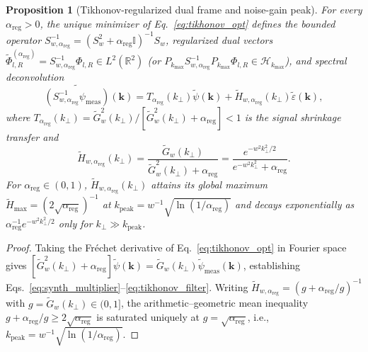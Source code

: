 \documentclass[aps,pra,reprint,amsmath,amssymb,floatfix,longbibliography]{revtex4-2}
\newtheorem{proposition}{Proposition}
\begin{document}
\begin{proposition}[Tikhonov-regularized dual frame and noise-gain peak]
\label{prop:tikhonov_dual}
For every $\alpha_{\mathrm{reg}} > 0$, the unique minimizer of Eq.~\eqref{eq:tikhonov_opt} defines the bounded operator $S_{w,\alpha_{\mathrm{reg}}}^{-1} = (S_w^2 + \alpha_{\mathrm{reg}}\mathbb{I})^{-1}S_w$, regularized dual vectors $\widetilde{\Phi}_{l,R}^{(\alpha_{\mathrm{reg}})} = S_{w,\alpha_{\mathrm{reg}}}^{-1}\Phi_{l,R} \in L^2(\mathbb{R}^2)$ (or $P_{k_{\max}}S_{w,\alpha_{\mathrm{reg}}}^{-1}P_{k_{\max}}\Phi_{l,R} \in \mathcal{H}_{k_{\max}}$), and spectral deconvolution
\begin{equation}
\widetilde{(S_{w,\alpha_{\mathrm{reg}}}^{-1}\psi_{\mathrm{meas}})}(\mathbf{k}) = T_{\alpha_{\mathrm{reg}}}(k_\perp)\widetilde{\psi}(\mathbf{k}) + \widetilde{H}_{w,\alpha_{\mathrm{reg}}}(k_\perp)\widetilde{\varepsilon}(\mathbf{k}),
\label{eq:synth_multiplier}
\end{equation}
where $T_{\alpha_{\mathrm{reg}}}(k_\perp) = \widetilde{G}_w^2(k_\perp)/[\widetilde{G}_w^2(k_\perp) + \alpha_{\mathrm{reg}}] < 1$ is the signal shrinkage transfer and
\begin{equation}
\widetilde{H}_{w,\alpha_{\mathrm{reg}}}(k_\perp) = \frac{\widetilde{G}_w(k_\perp)}{\widetilde{G}_w^2(k_\perp) + \alpha_{\mathrm{reg}}} = \frac{e^{-w^2 k_\perp^2/2}}{e^{-w^2 k_\perp^2} + \alpha_{\mathrm{reg}}}.
\label{eq:tikhonov_filter}
\end{equation}
For $\alpha_{\mathrm{reg}} \in (0,1)$, $\widetilde{H}_{w,\alpha_{\mathrm{reg}}}(k_\perp)$ attains its global maximum $\widetilde{H}_{\max} = (2\sqrt{\alpha_{\mathrm{reg}}})^{-1}$ at $k_{\mathrm{peak}} = w^{-1}\sqrt{\ln(1/\alpha_{\mathrm{reg}})}$ and decays exponentially as $\alpha_{\mathrm{reg}}^{-1}e^{-w^2 k_\perp^2/2}$ only for $k_\perp \gg k_{\mathrm{peak}}$.
\end{proposition}
\begin{proof}
Taking the Fr\'echet derivative of Eq.~\eqref{eq:tikhonov_opt} in Fourier space gives $[\widetilde{G}_w^2(k_\perp) + \alpha_{\mathrm{reg}}]\widetilde{\psi}(\mathbf{k}) = \widetilde{G}_w(k_\perp)\widetilde{\psi}_{\mathrm{meas}}(\mathbf{k})$, establishing Eqs.~\eqref{eq:synth_multiplier}--\eqref{eq:tikhonov_filter}. Writing $\widetilde{H}_{w,\alpha_{\mathrm{reg}}} = (g + \alpha_{\mathrm{reg}}/g)^{-1}$ with $g = \widetilde{G}_w(k_\perp) \in (0,1]$, the arithmetic--geometric mean inequality $g + \alpha_{\mathrm{reg}}/g \ge 2\sqrt{\alpha_{\mathrm{reg}}}$ is saturated uniquely at $g = \sqrt{\alpha_{\mathrm{reg}}}$, i.e., $k_{\mathrm{peak}} = w^{-1}\sqrt{\ln(1/\alpha_{\mathrm{reg}})}$.
\end{proof}
\end{document}
